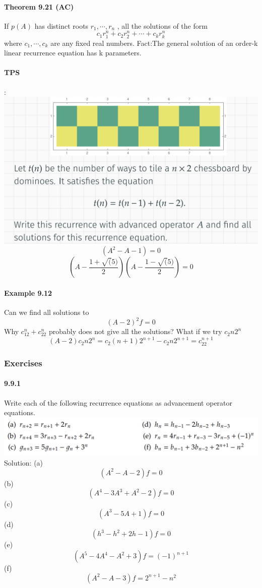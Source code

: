 \documentclass{article}
\begin{document}
\paragraph{Theorem 9.21 (AC)}
If $p(A)$ has distinct roots $r_1,\cdots,r_n$
, all the solutions of the form $$c_1r^n_1+c_2r^n_2+\cdots +c_kr^n_k$$
where $c_1,\cdots ,c_k$ are any fixed real numbers.\newline
Fact:The general solution of an order-k linear recurrence equation
has k parameters.
\paragraph{TPS}:\newline
\includegraphics{0022}\newline
$$(A^2-A-1)=0$$
$$(A-\frac{1+\sqrt(5)}{2})(A-\frac{1-\sqrt(5)}{2})=0$$
\paragraph{Example 9.12}
Can we find all solutions to $$(A-2)^2f=0$$
Why $c_12^n+c_22^n$ probably does not give all the solutions?\newline
What if we try $c_2n2^n$
$$(A-2)c_2n2^n=c_2(n+1)2^{n+1}-c_2n2^{n+1}=c_22^{n+1}$$
\subsubsection{Exercises}
\paragraph{9.9.1}
Write each of the following recurrence equations as advancement operator equations.\newline
\includegraphics{0032}\newline
Solution:\newline
(a)$$(A^2 - A - 2)f = 0$$
(b)$$(A^4-3A^3+A^2-2)f=0$$
(c)$$(A^3-5A+1)f=0$$
(d)$$(h^3-h^2+2h-1)f=0$$
(e)$$(A^5 - 4A^4 - A^2 + 3)f =(-1)^{n+1}$$
(f)$$(A^2-A-3)f=2^{n+1}-n^2$$
\end{document}
